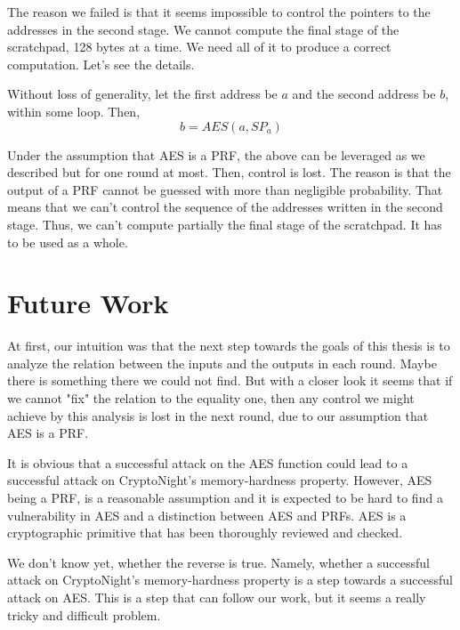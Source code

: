 The reason we failed is that it seems impossible to control the pointers to the addresses in the second stage. We cannot compute the final stage of the scratchpad, 128 bytes at a time. We need all of it to produce a correct computation. Let's see the details.

Without loss of generality, let the first address be $a$ and the second address be $b$, within some loop. Then,
\begin{equation} \nonumber
  b = AES(a,SP_a)
\end{equation}

Under the assumption that AES is a PRF, the above can be leveraged as we described but for one round at most. Then, control is lost. The reason is that the output of a PRF cannot be guessed with more than negligible probability. That means that we can't control the sequence of the addresses written in the second stage. Thus, we can't compute partially the final stage of the scratchpad. It has to be used as a whole.

\section{Future Work}
At first, our intuition was that the next step towards the goals of this thesis is to analyze the relation between the inputs and the outputs in each round. Maybe there is something there we could not find. But with a closer look it seems that if we cannot "fix" the relation to the equality one, then any control we might achieve by this analysis is lost in the next round, due to our assumption that AES is a PRF.

It is obvious that a successful attack on the AES function could lead to a successful attack on CryptoNight's memory-hardness property. However, AES being a PRF, is a reasonable assumption and it is expected to be hard to find a vulnerability in AES and a distinction between AES and PRFs. AES is a cryptographic primitive that has been thoroughly reviewed and checked.

We don't know yet, whether the reverse is true. Namely, whether a successful attack on CryptoNight's memory-hardness property is a step towards a successful attack on AES. This is a step that can follow our work, but it seems a really tricky and difficult problem.

